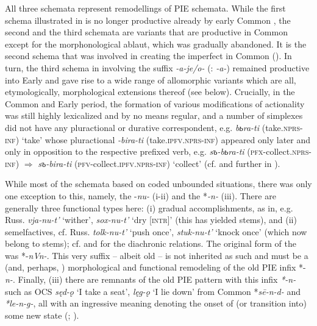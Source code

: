 \documentclass[output=paper]{langsci/langscibook}
\begin{document}
All three schemata represent remodellings of PIE schemata. While the first schema illustrated in  is no longer productive already by early Common , the second and the third schemata are variants that are productive in Common  except for the morphonological ablaut, which was gradually abandoned. It is the second schema that was involved in creating the imperfect in Common  (). In turn, the third schema in  involving the suffix \textit{-a-je/o-} (: \textit{-a-}) remained productive into Early  and gave rise to a wide range of allomorphic variants which are all, etymologically, morphological extensions thereof (see  below).
Crucially, in the Common  and Early  period, the formation of various modifications of actionality was still highly lexicalized and by no means regular, and a number of simplexes did not have any pluractional or durative correspondent, e.g. \textit{b}\textit{ь}\textit{ra-ti} (take.\textsc{nprs-inf}) ‘take’ whose pluractional \textit{-bira-ti} (take.\textsc{ipfv.nprs-inf}) appeared only later and only in opposition to the respective prefixed verb, e.g. \textit{s}\textit{ъ}\textit{-b}\textit{ь}\textit{ra-ti} (\textsc{pfx}-collect\textsc{.nprs-inf}) ${\Rightarrow}$ \textit{s}\textit{ъ}\textit{-bira-ti} (\textsc{pfv}-collect.\textsc{ipfv.nprs-inf}) ‘collect’ (cf. \citet{Maslov2004[1959]} and further in ).

While most of the schemata based on  coded unbounded situations, there was only one exception to this, namely, the  -\textit{nu-} (i-ii) and the  *\textit{-n-} (iii). There are generally three functional types here: (i) gradual accomplishments, as in, e.g. Russ. \textit{vja-nu-t’} ‘wither’, \textit{sox-nu-t’} ‘dry [\textsc{intr}]’ (this has yielded  stems), and (ii) semelfactives, cf. Russ. \textit{tolk-nu-t’} ‘push once’, \textit{stuk-nu-t’} ‘knock once’ (which now belong to  stems); cf. \citet[45]{SłPrasłow1974} and \citet{Nesset2013} for the diachronic relations. The original form of the  was *-\textit{nVn-}. This very suffix – albeit old – is not inherited as such and must be a  (and, perhaps, ) morphological and functional remodeling of the old PIE infix *-\textit{n-}. Finally, (iii) there are remnants of the old PIE pattern with this infix \textit{*-n-} such as OCS \textit{sęd-\k{o}} ‘I take a seat’, \textit{lęg-\k{o}} ‘I lie down’ from Common  *\textit{sē-n-d-} and \textit{*le-n-g-}, all with an ingressive meaning denoting the onset of (or transition into) some new state (\citealt[383]{Ivanov1964}; \citealt{Rasmussen1988}).
\end{document}
